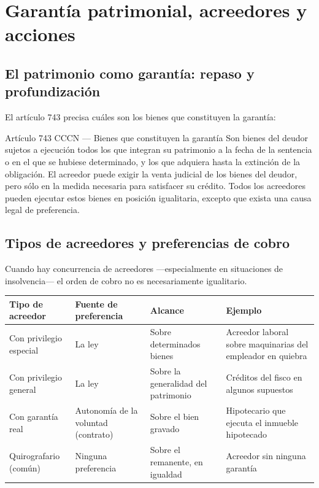 \documentclass[12pt,oneside]{book}
\newenvironment{tabla}{%
    \par\medskip\begingroup\small\renewcommand{\arraystretch}{1.3}\noindent\ignorespaces
}{%
    \par\endgroup\medskip
}
\begin{document}
\chapter{Garantía patrimonial, acreedores y acciones}

\section{El patrimonio como garantía: repaso y profundización}

El artículo 743 precisa cuáles son los bienes que constituyen la garantía:

\begin{norma}{Artículo 743 CCCN --- Bienes que constituyen la garantía}
Son bienes del deudor sujetos a ejecución todos los que integran su patrimonio a la fecha de la sentencia o en el que se hubiese determinado, y los que adquiera hasta la extinción de la obligación. El acreedor puede exigir la venta judicial de los bienes del deudor, pero sólo en la medida necesaria para satisfacer su crédito. Todos los acreedores pueden ejecutar estos bienes en posición igualitaria, excepto que exista una causa legal de preferencia.
\end{norma}

\section{Tipos de acreedores y preferencias de cobro}

Cuando hay concurrencia de acreedores ---especialmente en situaciones de insolvencia--- el orden de cobro no es necesariamente igualitario.

\begin{tabla}
\begin{tabularx}{\textwidth}{B{2.7cm}YYY}
\toprule
Tipo de acreedor & \textbf{Fuente de preferencia} & \textbf{Alcance} & \textbf{Ejemplo} \\
\midrule
Con privilegio especial & La ley & Sobre determinados bienes & Acreedor laboral sobre maquinarias del empleador en quiebra \\
Con privilegio general & La ley & Sobre la generalidad del patrimonio & Créditos del fisco en algunos supuestos \\
Con garantía real & Autonomía de la voluntad (contrato) & Sobre el bien gravado & Hipotecario que ejecuta el inmueble hipotecado \\
Quirografario (común) & Ninguna preferencia & Sobre el remanente, en igualdad & Acreedor sin ninguna garantía \\
\bottomrule
\end{tabularx}
\end{tabla}
\end{document}
